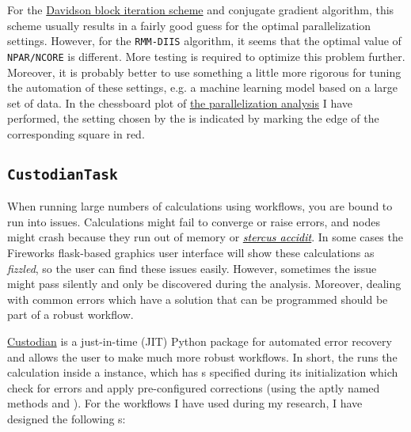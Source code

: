\begin{refsection}
\begin{itemize}
\end{itemize} 
 
For the \href{https://joshuagoings.com/2013/08/23/davidsons-method/}{Davidson 
block iteration scheme} and conjugate gradient algorithm, this scheme usually 
results in a fairly good guess for the optimal parallelization settings. 
However, for the \texttt{RMM-DIIS} algorithm, it seems that 
the optimal value of \texttt{NPAR/NCORE} is different. More testing is 
required to optimize this problem further. Moreover, it is probably better to 
use something a little more rigorous for tuning the automation of these 
settings, e.g. a machine learning model based on a large set of data. In 
the chessboard plot of 
\href{https://mybinder.org/v2/gh/mbercx/jupyter/master?filepath=parallel\%2Fparallel_analysis.ipynb}{the 
parallelization analysis} I have performed, the setting chosen by the 
 is indicated by marking the edge of the corresponding square in red. 
 
\subsection{\texttt{CustodianTask}} \label{automation:sec-CustodianTask} 
 
When running large numbers of calculations using workflows, you are bound to 
run into issues. Calculations might fail to converge or raise errors, and 
nodes might crash because they run out of memory or 
\href{https://www.urbandictionary.com/define.php?term=stercus\%20accidit}{\textcolor{black}{\textit{stercus 
accidit}}}. In some cases the Fireworks flask-based graphics user interface 
will show these calculations as \textit{fizzled}, so the user can find these 
issues easily. However, sometimes the issue might pass silently and only be 
discovered during the analysis. Moreover, dealing with common errors which 
have a solution that can be programmed should be part of a robust workflow. 
 
\href{https://materialsproject.github.io/custodian/}{Custodian} is a 
just-in-time (JIT) Python package for automated error recovery and allows the 
user to make much more robust workflows. In short, the  
runs the calculation inside a  instance, which has 
s specified during its initialization which check for 
errors and apply pre-configured corrections (using the aptly named methods 
 and ). For the workflows I have used during my 
research, I have designed the following s: 
 

\end{refsection}
